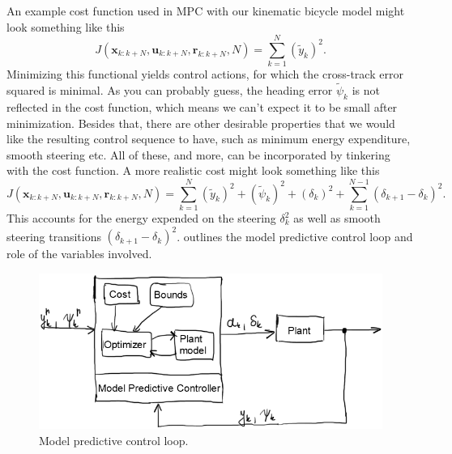 \documentclass[a4paper]{article}
\begin{document}
An example cost function used in MPC with our kinematic bicycle model might look something like this
\begin{equation}\label{eq:mpc_cost_simple}
	J(\bm{x}_{k:k+N}, \bm{u}_{k:k+N}, \bm{r}_{k:k+N}, N) = \sum_{k=1}^{N} (\tilde{y}_k)^2.
\end{equation}
Minimizing this functional yields control actions, for which the cross-track error squared is minimal.
As you can probably guess, the heading error \( \tilde{\psi}_k \) is not reflected in the cost function, which means we can't expect it to be small after minimization.
Besides that, there are other desirable properties that we would like the resulting control sequence to have, such as minimum energy expenditure, smooth steering etc.
All of these, and more, can be incorporated by tinkering with the cost function.
A more realistic cost might look something like this
\begin{equation}\label{eq:mpc_cost_better}
	J(\bm{x}_{k:k+N}, \bm{u}_{k:k+N}, \bm{r}_{k:k+N}, N) = \sum_{k=1}^{N} (\tilde{y}_k)^2 + (\tilde{\psi}_k)^2 + (\delta_k)^2+ \sum_{k=1}^{N-1} (\delta_{k+1} - \delta_k)^2.
\end{equation}
This accounts for the energy expended on the steering \( \delta_k^2 \) as well as smooth steering transitions \( (\delta_{k+1} - \delta_k)^2 \).
 outlines the model predictive control loop and role of the variables involved.
\begin{figure}[h]
	\centering
	\includegraphics[width=0.8\columnwidth]{./img/mpc_control_loop.png}
	\caption{Model predictive control loop.}
	\label{fig:mpc_control_loop}
\end{figure}









\end{document}
